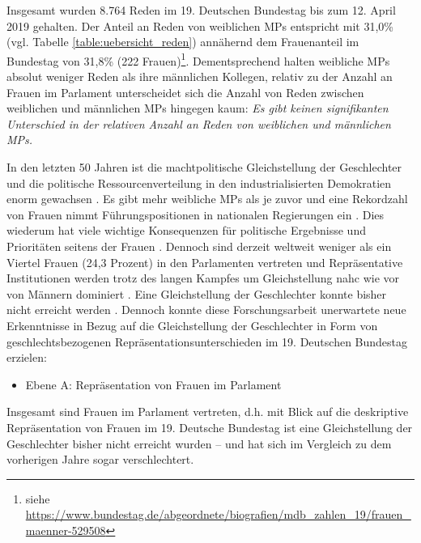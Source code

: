 \documentclass[12pt, 
    twoside=false, 
    bibliography=totoc, 
    numbers=endperiod, 
    headings=normal, 
    toc=chapterentrydotfill
    ]{scrbook}
\begin{document}
Insgesamt wurden 8.764 Reden im 19. Deutschen Bundestag bis zum 12. April 2019 gehalten.  Der Anteil an Reden von weiblichen MPs entspricht mit 31,0\% (vgl. Tabelle \ref{table:uebersicht_reden}) annähernd dem Frauenanteil im Bundestag von 31,8\% (222 Frauen)\footnote{siehe \url{https://www.bundestag.de/abgeordnete/biografien/mdb_zahlen_19/frauen_maenner-529508}}. Dementsprechend halten weibliche MPs absolut weniger Reden als ihre männlichen Kollegen, relativ zu der Anzahl an Frauen im Parlament unterscheidet sich die Anzahl von Reden zwischen weiblichen und männlichen MPs hingegen kaum: \emph{Es gibt keinen signifikanten Unterschied in der relativen Anzahl an Reden von weiblichen und männlichen MPs.}











In den letzten 50 Jahren ist die machtpolitische Gleichstellung der Geschlechter und die politische Ressourcenverteilung in den industrialisierten Demokratien enorm gewachsen \parencite[318]{coffe_2010}. Es gibt mehr weibliche MPs als je zuvor und eine Rekordzahl von Frauen nimmt Führungspositionen in nationalen Regierungen ein  \parencites{lovenduski_2005}{paxton_2007}. Dies wiederum hat viele wichtige Konsequenzen für politische Ergebnisse und Prioritäten seitens der Frauen \parencites{bolzendahl_2007}{carroll_2001}{waring_2000}[318]{coffe_2010}. Dennoch sind derzeit weltweit weniger als ein Viertel Frauen (24,3 Prozent) in den Parlamenten vertreten \parencite{ipu_2019} und Repräsentative Institutionen werden trotz des langen Kampfes um Gleichstellung nahc wie vor von Männern dominiert \parencites[149]{celis_2018}[497 f.]{childs_2013}{dahlerup_2013}{bjarnegard_2013}. Eine Gleichstellung der Geschlechter konnte bisher nicht erreicht werden \parencite[150]{celis_2018}.
Dennoch konnte diese Forschungsarbeit unerwartete neue Erkenntnisse in Bezug auf die Gleichstellung der Geschlechter in Form von geschlechtsbezogenen Repräsentationsunterschieden im 19. Deutschen Bundestag erzielen:

\begin{itemize}
   \item Ebene A: Repräsentation von Frauen im Parlament
 \end{itemize}
   Insgesamt sind Frauen im Parlament vertreten, d.h. mit Blick auf die deskriptive Repräsentation von Frauen im 19. Deutsche Bundestag ist eine Gleichstellung der Geschlechter bisher nicht erreicht wurden -- und hat sich im Vergleich zu dem vorherigen Jahre sogar verschlechtert. 
\end{document}
